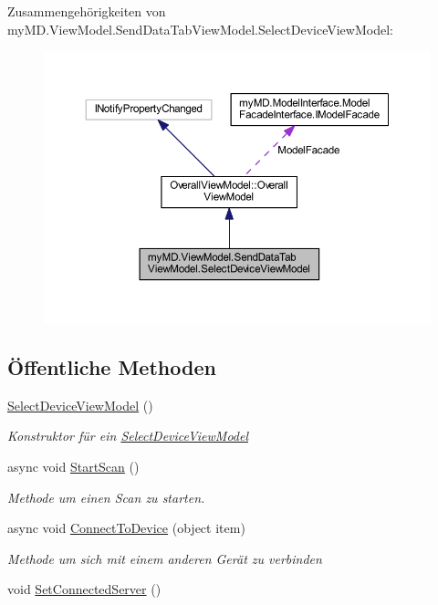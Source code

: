 Zusammengehörigkeiten von my\+M\+D.\+View\+Model.\+Send\+Data\+Tab\+View\+Model.\+Select\+Device\+View\+Model\+:\nopagebreak
\begin{figure}[H]
\begin{center}
\leavevmode
\includegraphics[width=350pt]{classmy_m_d_1_1_view_model_1_1_send_data_tab_view_model_1_1_select_device_view_model__coll__graph}
\end{center}
\end{figure}
\subsection*{Öffentliche Methoden}
\begin{DoxyCompactItemize}
\item 
\mbox{\hyperlink{classmy_m_d_1_1_view_model_1_1_send_data_tab_view_model_1_1_select_device_view_model_a39d908572f42325912210144d3614d66}{Select\+Device\+View\+Model}} ()
\begin{DoxyCompactList}\small\item\em Konstruktor für ein \mbox{\hyperlink{classmy_m_d_1_1_view_model_1_1_send_data_tab_view_model_1_1_select_device_view_model}{Select\+Device\+View\+Model}} \end{DoxyCompactList}\item 
async void \mbox{\hyperlink{classmy_m_d_1_1_view_model_1_1_send_data_tab_view_model_1_1_select_device_view_model_a9c836594d494df1bfc2483c5ae4514b0}{Start\+Scan}} ()
\begin{DoxyCompactList}\small\item\em Methode um einen Scan zu starten. \end{DoxyCompactList}\item 
async void \mbox{\hyperlink{classmy_m_d_1_1_view_model_1_1_send_data_tab_view_model_1_1_select_device_view_model_a07fe293eff7f20b4535164182933621a}{Connect\+To\+Device}} (object item)
\begin{DoxyCompactList}\small\item\em Methode um sich mit einem anderen Gerät zu verbinden \end{DoxyCompactList}\item 
void \mbox{\hyperlink{classmy_m_d_1_1_view_model_1_1_send_data_tab_view_model_1_1_select_device_view_model_a836cbee87fa86a563de42d4b68da3783}{Set\+Connected\+Server}} ()
\end{DoxyCompactItemize}

